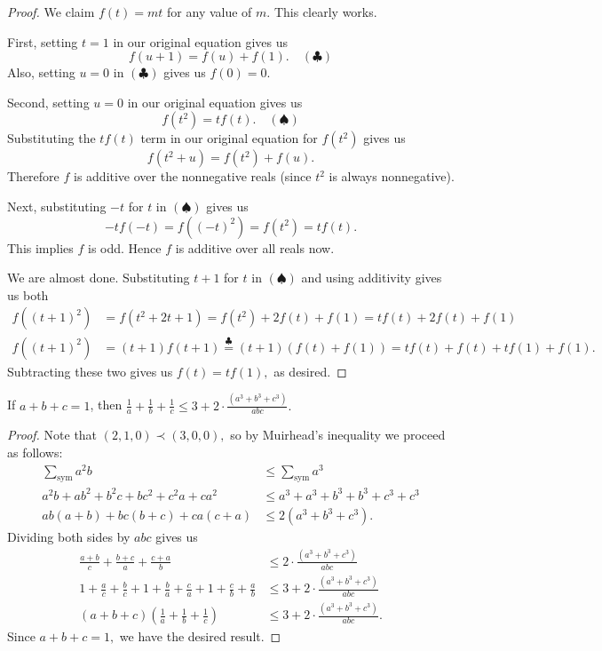 \documentclass[letterpaper,oneside]{scrartcl}
\begin{document}
\begin{proof}
  We claim \(f(t)=mt\) for any value of \(m\). This clearly works.

  First, setting \(t=1\) in our original equation gives us
  \[f(u+1) = f(u) + f(1). \quad (\clubsuit)\]
  Also, setting \(u=0\) in \((\clubsuit)\) gives us \(f(0)=0.\)

  Second, setting \(u=0\) in our original equation gives us
  \[f(t^2) = tf(t). \quad (\spadesuit)\]
  Substituting the \(tf(t)\) term in our original equation for \(f(t^2)\) gives us
  \[f(t^2+u) = f(t^2) + f(u).\]
  Therefore \(f\) is additive over the nonnegative reals (since \(t^2\) is always nonnegative).

  Next, substituting \(-t\) for \(t\) in \((\spadesuit)\) gives us
  \[-tf(-t) = f((-t)^2) = f(t^2) = tf(t).\]
  This implies \(f\) is odd. Hence \(f\) is additive over all reals now.

  We are almost done. Substituting \(t+1\) for \(t\) in \((\spadesuit)\) and using additivity gives us both
  \begin{align*}
    f((t+1)^2) & = f(t^2+2t+1) = f(t^2) + 2f(t) + f(1) = tf(t) + 2f(t) + f(1)                         \\
    f((t+1)^2) & = (t+1)f(t+1) \overset{\clubsuit}{=} (t+1)(f(t)+f(1)) = tf(t) + f(t) + tf(1) + f(1).
  \end{align*}
  Subtracting these two gives us \(f(t) = tf(1),\) as desired.
\end{proof}
\newpage
\begin{problem*}
  If \(a+b+c=1\), then \(\frac1a + \frac1b + \frac1c \leq 3 + 2\cdot\frac{\left(a^3+b^3+c^3\right)}{abc}.\)
\end{problem*}
\begin{proof}
  Note that \((2,1,0) \prec (3,0,0),\) so by Muirhead's inequality we proceed as follows:
  \begin{align*}
    \sum_{\text{sym}} a^2b            & \leq \sum_{\text{sym}} a^3      \\
    a^2b+ab^2 + b^2c+bc^2 + c^2a+ca^2 & \leq a^3+a^3+b^3+b^3+c^3+c^3    \\
    ab(a+b) + bc(b+c) + ca(c+a)       & \leq 2\left(a^3+b^3+c^3\right).
  \end{align*}
  Dividing both sides by \(abc\) gives us
  \begin{align*}
    \frac{a+b}{c} + \frac{b+c}{a} + \frac{c+a}{b}                                                 & \leq 2\cdot\frac{\left(a^3+b^3+c^3\right)}{abc}      \\
    1 + \frac{a}{c} + \frac{b}{c} + 1 + \frac{b}{a} + \frac{c}{a} + 1 + \frac{c}{b} + \frac{a}{b} & \leq 3 + 2\cdot\frac{\left(a^3+b^3+c^3\right)}{abc}  \\
    (a+b+c)\left(\frac1a + \frac1b + \frac1c\right)                                               & \leq 3 + 2\cdot\frac{\left(a^3+b^3+c^3\right)}{abc}.
  \end{align*}
  Since \(a+b+c=1,\) we have the desired result.
\end{proof}
\end{document}
